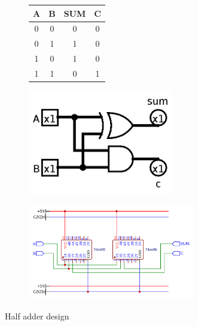 \documentclass{article}
\begin{document}
\begin{figure}[H]
\begin{subfigure}{0.5\textwidth}
\centering
\begin{tabular}{|c|c|c|c|}
\hline
A & B & SUM & C \\
\hline
0 & 0 & 0 & 0 \\
0 & 1 & 1 & 0 \\
1 & 0 & 1 & 0 \\
1 & 1 & 0 & 1 \\
\hline
\end{tabular}
\end{subfigure}%
\begin{subfigure}{0.5\textwidth}
	\centering
	\includegraphics[width=0.7\textwidth]{half_adder_logisim.png}
\end{subfigure}
\begin{subfigure}{\textwidth}
	\centering
	\includegraphics[width=0.8\textwidth]{half_adder_easyeda.png}
\end{subfigure}
\caption{Half adder design}
\end{figure}

\newpage
\end{document}
